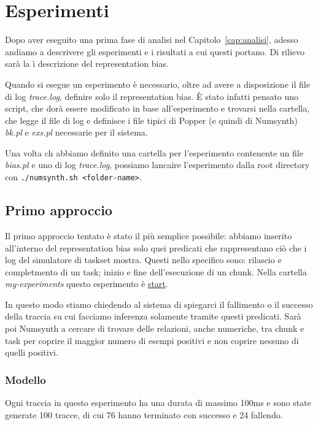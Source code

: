 \chapter{Esperimenti}
Dopo aver eseguito una prima fase di analisi nel Capitolo~\ref{cap:analisi}, adesso andiamo a descrivere gli esperimenti e i risultati a cui questi portano. Di rilievo sarà la ì descrizione del representation bias.

\myskip

Quando si esegue un esperimento è necessario, oltre ad avere a disposizione il file di log \textit{trace.log}, definire solo il representation bias. È stato infatti pensato uno script, che dorà essere modificato in base all'esperimento e trovarsi nella cartella, che legge il file di log e definisce i file tipici di Popper (e quindi di Numsynth) \textit{bk.pl} e \textit{exs.pl} necessarie per il sistema.

Una volta ch abbiamo definito una cartella per l'esperimento contenente un file \textit{bias.pl} e uno di log \textit{trace.log}, possiamo lancaire l'esperimento dalla root directory con \texttt{./numsynth.sh <folder-name>}.

\section{Primo approccio}
Il primo approccio tentato è stato il più semplice possibile: abbiamo inserito all'interno del representation bias solo quei predicati che rappresentano ciò che i log del simulatore di taskset mostra. Questi nello specifico sono: rilascio e completmento di un task; inizio e fine dell'esecuzione di un chunk. Nella cartella \textit{my-experiments} questo esperimento è \href{https://github.com/edoardosarri24/numsynth/tree/main/my-experiments/1-start}{start}.

In questo modo stiamo chiedendo al sistema di spiegarci il fallimento o il successo della traccia su cui facciamo inferenza solamente tramite questi predicati. Sarà poi Numsynth a cercare di trovare delle relazioni, anche numeriche, tra chunk e task per coprire il maggior numero di esempi positivi e non coprire nessuno di quelli positivi.

\subsection{Modello}
Ogni traccia in questo esperimento ha una durata di massimo 100ms e sono state generate 100 tracce, di cui 76 hanno terminato con successo e 24 fallendo.

